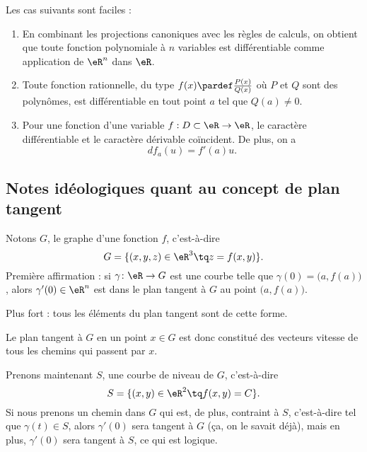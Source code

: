 \begin{example}
	Les cas suivants sont faciles :
	\begin{enumerate}
		\item En combinant les projections canoniques avec les règles de
		      calculs, on obtient que toute fonction polynomiale à \( n\) variables
		      est différentiable comme application de \( \eR^n\) dans \( \eR\).

		\item Toute fonction rationnelle, du type \( f(x) \pardef
			      \frac{P(x)}{Q(x)}\) où \( P\) et \( Q\) sont des polynômes, est
		      différentiable en tout point \( a\) tel que \( Q(a) \neq 0\).

		\item Pour une fonction d'une variable \( f : D \subset \eR \to
			      \eR\), le caractère différentiable et le caractère dérivable
		      coïncident. De plus, on a
		      \begin{equation*}
			      d f_a(u) = f'(a) u.
		      \end{equation*}
	\end{enumerate}
\end{example}

\subsection{Notes idéologiques quant au concept de plan tangent}
\label{ssecConceptPlanTag}

Notons \( G\), le graphe d'une fonction \( f\), c'est-à-dire
\begin{equation}
	G=\{ (x,y,z)\in\eR^3\tq z=f(x,y) \}.
\end{equation}
Première affirmation : si \( \gamma\colon \eR\to G\) est une courbe telle que \( \gamma(0)=\big( a,f(a) \big)\), alors \( \gamma'(0)\in\eR^n\) est dans le plan tangent à \( G\) au point \( \big( a,f(a) \big)\).

Plus fort : tous les éléments du plan tangent sont de cette forme.

Le plan tangent à \( G\) en un point \( x\in G\) est donc constitué des vecteurs vitesse de tous les chemins qui passent par \( x\).

Prenons maintenant \( S\), une courbe de niveau de \( G\), c'est-à-dire
\begin{equation}
	S=\{ (x,y)\in\eR^2\tq f(x,y)=C \}.
\end{equation}
Si nous prenons un chemin dans \( G\) qui est, de plus, contraint à \( S\), c'est-à-dire tel que \( \gamma(t)\in S\), alors \( \gamma'(0)\) sera tangent à \( G\) (ça, on le savait déjà), mais en plus, \( \gamma'(0)\) sera tangent à \( S\), ce qui est logique.

